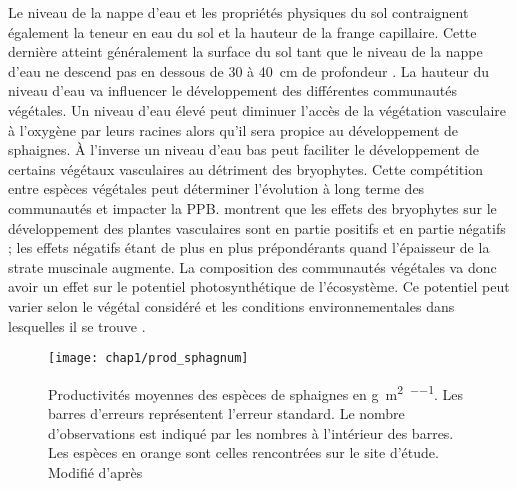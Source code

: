 
Le niveau de la nappe d'eau et les propriétés physiques du sol contraignent également la teneur en eau du sol et la hauteur de la frange capillaire.
Cette dernière atteint généralement la surface du sol tant que le niveau de la nappe d'eau ne descend pas en dessous de \num{30} à \SI{40}{\centi\metre} de profondeur \citep{laiho2006}.
La hauteur du niveau d'eau va influencer le développement des différentes communautés végétales.
Un niveau d'eau élevé peut diminuer l'accès de la végétation vasculaire à l'oxygène par leurs racines alors qu'il sera propice au développement de sphaignes.
À l'inverse un niveau d'eau bas peut faciliter le développement de certains végétaux vasculaires au détriment des bryophytes.
Cette compétition entre espèces végétales peut déterminer l'évolution à long terme des communautés et impacter la PPB.
\citet{gornall2011} montrent que les effets des bryophytes sur le développement des plantes vasculaires sont en partie positifs et en partie négatifs ; les effets négatifs étant de plus en plus prépondérants quand l'épaisseur de la strate muscinale augmente.
La composition des communautés végétales va donc avoir un effet sur le potentiel photosynthétique de l'écosystème.
Ce potentiel peut varier selon le végétal considéré et les conditions environnementales dans lesquelles il se trouve \citep{moore2002}.

\begin{figure}
\centering
\texttt{[image: chap1/prod\_sphagnum]}
\caption{Productivités moyennes des espèces de sphaignes en \si{\gram\per\square\metre\per\year}. Les barres d'erreurs représentent l'erreur standard. Le nombre d'observations est indiqué par les nombres à l'intérieur des barres. Les espèces en orange sont celles rencontrées sur le site d'étude. Modifié d'après \citet{gunnarsson2005}}
\label{fig:prod_sphagnum}
\end{figure}

